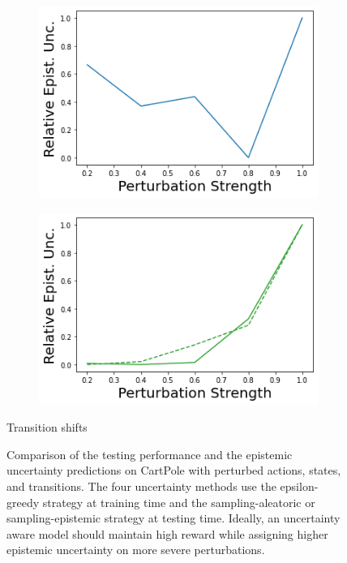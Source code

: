 \begin{figure}
\begin{subfigure}{.24\textwidth}
        \includegraphics[width=\textwidth]{sections/011_icml2022/resources/transition_shift-DKL-CartPoleShift-v0-mean_epistemic_uncertainty_.png}
    \end{subfigure}
    \begin{subfigure}{.24\textwidth}
        \includegraphics[width=\textwidth]{sections/011_icml2022/resources/transition_shift-PostNet-CartPoleShift-v0-mean_epistemic_uncertainty_.png}
    \end{subfigure}
    \vspace{-3mm}
    \caption*{Transition shifts}
    \vspace{2mm}

    \caption{Comparison of the testing performance and the epistemic uncertainty predictions on CartPole with perturbed actions, states, and transitions. The four uncertainty methods use the epsilon-greedy strategy at training time and the sampling-aleatoric or sampling-epistemic strategy at testing time. Ideally, an uncertainty aware model should maintain high reward while assigning higher epistemic uncertainty on more severe perturbations.}
    \label{fig:strategy-shift-testing-performance-cartpole}
        \vspace{-3mm}
\end{figure}